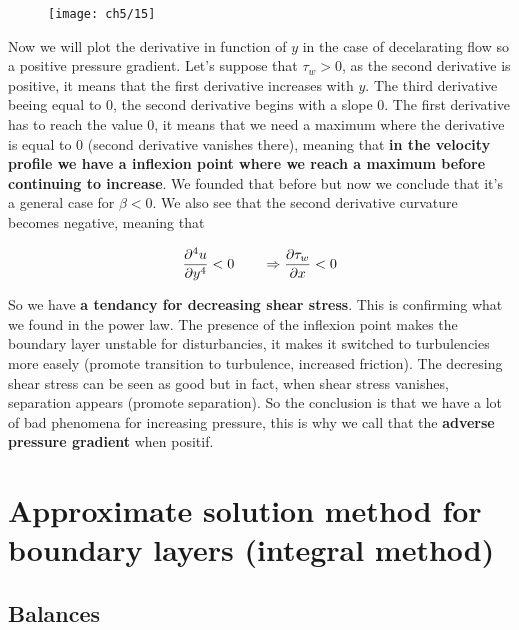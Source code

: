 	\begin{figure}
	\vspace{-5mm}
	\texttt{[image: ch5/15]}
	\label{fig:5.15}
	\end{figure}
	Now we will plot the derivative in function of $y$ in the case of decelarating flow so a positive pressure gradient. Let's suppose that $\tau _w >0$, as the second derivative is positive, it means that the first derivative increases with $y$. The third derivative beeing equal to 0, the second derivative begins with a slope 0. The first derivative has to reach the value 0, it means that we need a maximum where the derivative is equal to 0 (second derivative vanishes there), meaning that \textbf{in the velocity profile we have a inflexion point where we reach a maximum before continuing to increase}. We founded that before but now we conclude that it's a general case for $\beta <0$. We also see that the second derivative curvature becomes negative, meaning that 
	
	\begin{equation}
		\frac{\partial ^4 u}{\partial y^4} <0 \qquad \Rightarrow \frac{\partial \tau _w}{\partial x} < 0
	\end{equation}
			
	So we have \textbf{a tendancy for decreasing shear stress}. This is confirming what we found in the power law. The presence of the inflexion point makes the boundary layer unstable for disturbancies, it makes it switched to turbulencies more easely (promote transition to turbulence, increased friction). The decresing shear stress can be seen as good but in fact, when shear stress vanishes, separation appears (promote separation). So the conclusion is that we have a lot of bad phenomena for increasing pressure, this is why we call that the \textbf{adverse pressure gradient} when positif. 
	

\section{Approximate solution method for boundary layers (integral method)}
\subsection{Balances}

